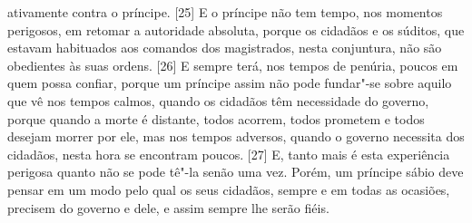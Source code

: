 ativamente contra o príncipe. {[}25{]} E o príncipe não tem tempo, nos
momentos perigosos, em retomar a autoridade absoluta, porque os cidadãos
e os súditos, que estavam habituados aos comandos dos magistrados, nesta
conjuntura, não são obedientes às suas ordens. {[}26{]} E sempre terá,
nos tempos de penúria, poucos em quem possa confiar, porque um príncipe
assim não pode fundar"-se sobre aquilo que vê nos tempos calmos, quando
os cidadãos têm necessidade do governo, porque quando a morte é
distante, todos acorrem, todos prometem e todos desejam morrer por ele,
mas nos tempos adversos, quando o governo necessita dos cidadãos, nesta
hora se encontram poucos. {[}27{]} E, tanto mais é esta experiência
perigosa quanto não se pode tê"-la senão uma vez. Porém, um príncipe
sábio deve pensar em um modo pelo qual os seus cidadãos, sempre e em
todas as ocasiões, precisem do governo e dele, e assim sempre lhe serão
fiéis.


